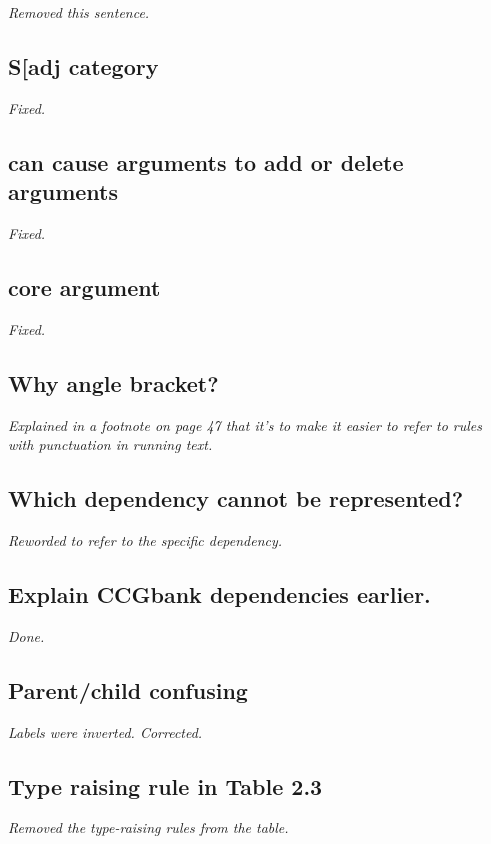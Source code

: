 \emph{Removed this sentence.}

\subsection{S[adj category}

\emph{Fixed.}

\subsection{can cause arguments to add or delete arguments}

\emph{Fixed.}

\subsection{core argument}

\emph{Fixed.}

\subsection{Why angle bracket?}

\emph{Explained in a footnote on page 47
that it's to make it easier to refer to rules with punctuation in running text.}

\subsection{Which dependency cannot be represented?}

\emph{Reworded to refer to the specific dependency.}

\subsection{Explain CCGbank dependencies earlier.}

\emph{Done.}

\subsection{Parent/child confusing}

\emph{Labels were inverted. Corrected.}

\subsection{Type raising rule in Table 2.3}

\emph{Removed the type-raising rules from the table.}

